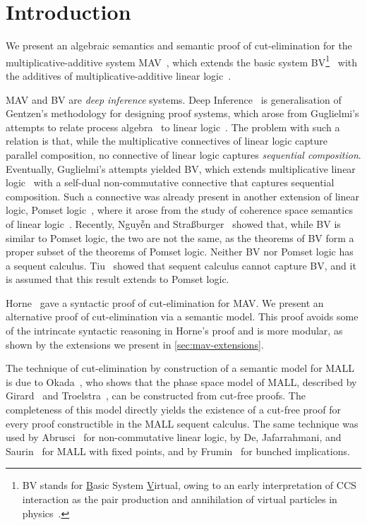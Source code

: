 \section{Introduction}\label{sec:introduction}

We present an algebraic semantics and semantic proof of cut-elimination for the multiplicative-additive system MAV~\cite{Horne15:mav}, which extends the basic system BV\footnote{
      BV stands for \underline{B}asic System \underline{V}irtual, owing to an early interpretation of CCS interaction as the pair production and annihilation of virtual particles in physics~\cite[]{Horne15:mav}.
}~\cite{Guglielmi99:bv,Guglielmi07:sis} with the additives of multiplicative-additive linear logic~\cite[MALL]{Girard87:ll}.

MAV and BV are \emph{deep inference} systems. Deep Inference~\cite{Guglielmi14:di} is generalisation of Gentzen's methodology for designing proof systems, which arose from Guglielmi's attempts to relate process algebra~\cite[CCS]{Milner80:CCS,Milner89:CC} to linear logic~\cite{Girard87:ll}.
The problem with such a relation is that, while the multiplicative connectives of linear logic capture parallel composition, no connective of linear logic captures \emph{sequential composition}.
Eventually, Guglielmi's attempts yielded BV, which extends multiplicative linear logic~\cite[MLL]{Girard87:ll} with a self-dual non-commutative connective that captures sequential composition.
Such a connective was already present in another extension of linear logic, Pomset logic~\cite{Retore97:pomset}, where it arose from the study of coherence space semantics of linear logic~\cite[]{GirardTL89:proofs}.
Recently, Nguyễn and Stra{\ss}burger~\cite{NguyenS22:bvisnotpl} showed that, while BV is similar to Pomset logic, the two are not the same, as the theorems of BV form a proper subset of the theorems of Pomset logic.
Neither BV nor Pomset logic has a sequent calculus. Tiu~\cite{Tiu06:sisii} showed that sequent calculus cannot capture BV, and it is assumed that this result extends to Pomset logic.

Horne~\cite{Horne15:mav} gave a syntactic proof of cut-elimination for MAV. We present an alternative proof of cut-elimination via a semantic model. This proof avoids some of the intrincate syntactic reasoning in Horne's proof and is more modular, as shown by the extensions we present in \cref{sec:mav-extensions}.

The technique of cut-elimination by construction of a semantic model for MALL is due to Okada~\cite{Okada99:psc}, who shows that the phase space model of MALL, described by Girard~\cite[\S4.1]{Girard87:ll} and Troelstra~\cite[]{Troelstra92:lll}, can be constructed from cut-free proofs.
The completeness of this model directly yields the existence of a cut-free proof for every proof constructible in the MALL sequent calculus.
The same technique was used by Abrusci~\cite{Abrusci91:psc} for non-commutative linear logic, by De, Jafarrahmani, and Saurin~\cite{De22:psc} for MALL with fixed points, and by Frumin~\cite{Frumin22:psc} for bunched implications.


